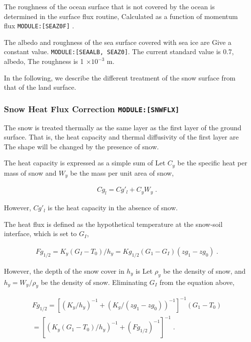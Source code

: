 The roughness of the ocean surface that is not covered by the ocean is
determined in the surface flux routine, Calculated as a function of
momentum flux \texttt{MODULE:{[}SEAZ0F{]}} .

The albedo and roughness of the sea surface covered with sea ice are
Give a constant value. \texttt{MODULE:{[}SEAALB,\ SEAZ0{]}}. The current
standard value is 0.7, albedo, The roughness is 1 \(\times10^{-3}\) m.

In the following, we describe the different treatment of the snow
surface from that of the land surface.

\hypertarget{snow-heat-flux-correction-modulesnwflx}{%
\subsubsection{\texorpdfstring{Snow Heat Flux Correction
\texttt{MODULE:{[}SNWFLX{]}}}{Snow Heat Flux Correction MODULE:{[}SNWFLX{]}}}\label{snow-heat-flux-correction-modulesnwflx}}

The snow is treated thermally as the same layer as the first layer of
the ground surface. That is, the heat capacity and thermal diffusivity
of the first layer are The shape will be changed by the presence of
snow.

The heat capacity is expressed as a simple sum of Let \(C_y\) be the
specific heat per mass of snow and \(W_y\) be the mass per unit area of
snow,

\begin{eqnarray}
  Cg_{l} = Cg'_{l} + C_y W_y \; .
\end{eqnarray}

However, \(Cg'_{l}\) is the heat capacity in the absence of snow.

The heat flux is defined as the hypothetical temperature at the
snow-soil interface, which is set to \(G_I\),

\begin{eqnarray}
  Fg_{1/2} = K_y (G_I-T_0)/h_y = Kg_{1/2} (G_1 - G_I)(zg_1 - zg_0) \; .
\end{eqnarray}

However, the depth of the snow cover in \(h_y\) is Let \(\rho_y\) be the
density of snow, and \(h_y = W_y/\rho_y\) be the density of snow.
Eliminating \(G_I\) from the equation above,

\begin{eqnarray}
  Fg_{1/2}  = \left[ \left( K_y/h_y \right)^{-1} 
                   +  \left( K_g /(zg_1 - zg_0) \right)^{-1} 
              \right]^{-1} (G_1-T_0)
                    \\
            = \left[ \left( K_y (G_1-T_0)/h_y \right)^{-1} 
                    +  (Fg_{1/2})^{-1}
                \right]^{-1} \; .
\end{eqnarray}

